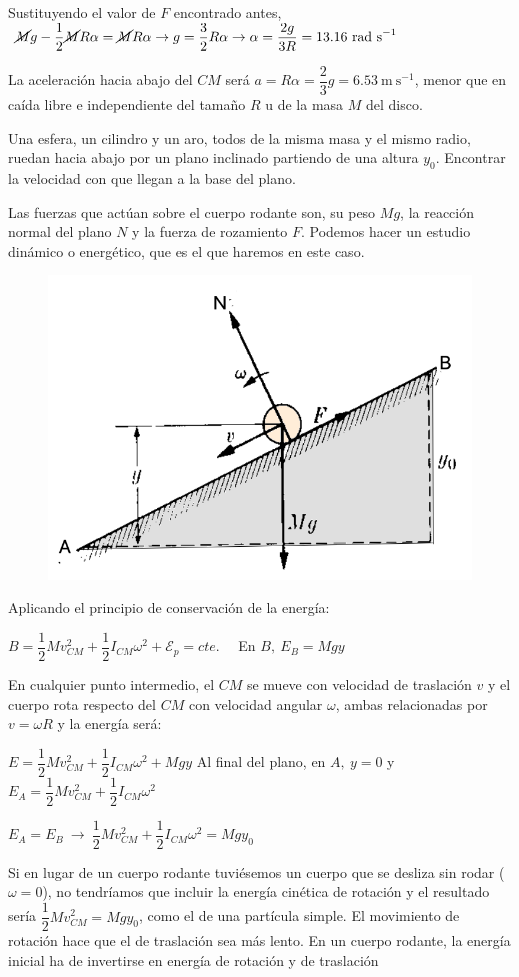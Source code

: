 Sustituyendo el valor de $F$ encontrado antes, $ \ \cancel{M}g-\dfrac 1 2 \cancel{M}R\alpha=\cancel{M}R\alpha \to g=\dfrac 3 2 R\alpha \to \alpha =\dfrac{2g}{3R}=13.16\ \mathrm{rad\ s}^{-1}$

La aceleración hacia abajo del $CM$ será $a=R\alpha=\dfrac 2 3 g= 6.53 \  \mathrm{m\ s}^{-1}$, menor que en caída libre e independiente del tamaño $R$ u de la masa $M$ del disco.

\begin{prob}
Una esfera, un cilindro y un aro, todos de la misma masa y el mismo radio, ruedan hacia abajo por un plano inclinado partiendo de una altura $y_0$. Encontrar la velocidad con que llegan a la base del plano.	
\end{prob}

\begin{multicols}{2}
Las fuerzas que actúan sobre el cuerpo rodante son, su peso $Mg$, la reacción normal del plano $N$ y la fuerza de rozamiento $F$. Podemos hacer un estudio dinámico o energético, que es el que haremos en este caso.
\begin{figure}[H]
	\centering
	\includegraphics[width=.45\textwidth]{imagenes/imagenes16/T16IM14.png}
\end{figure}	
\end{multicols}
Aplicando el principio de conservación de la energía:

$B=\dfrac 1 2 Mv^2_{CM} + \dfrac 1 2 I_{CM} \omega^2 + \mathcal E_p = cte.\quad$ En $B,\  E_B=Mgy$

En cualquier punto intermedio, el $CM$ se mueve con velocidad de traslación $v$ y el cuerpo rota respecto del $CM$ con velocidad angular $\omega$, ambas relacionadas por $v=\omega R$ y la energía será:

$E=\dfrac 1 2 Mv^2_{CM} + \dfrac 1 2 I_{CM} \omega^2 + Mgy$ 
Al final del plano, en $A,\ y=0$ y $E_A=\dfrac 1 2 Mv^2_{CM} + \dfrac 1 2 I_{CM} \omega^2$ 

$E_A=E_B \ \to \ \dfrac 1 2 Mv^2_{CM} + \dfrac 1 2 I_{CM} \omega^2=Mgy_0$

Si en lugar de un cuerpo rodante tuviésemos un cuerpo que se desliza sin rodar ($\omega=0$), no tendríamos que incluir la energía cinética de rotación y el resultado sería $\dfrac 1 2 Mv^2_{CM} =Mgy_0$, como el de una partícula simple. El movimiento de rotación hace que el de traslación sea más lento. En un cuerpo rodante, la energía inicial ha de invertirse en energía de rotación y de traslación

